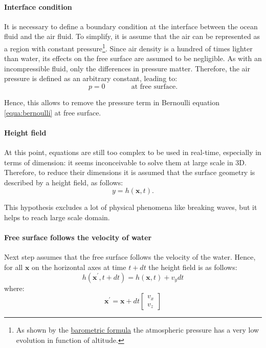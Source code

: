 \documentclass[final]{jcgt}
\begin{document}
\paragraph{Interface condition}
It is necessary to define a boundary condition at the interface between the ocean fluid and the air fluid.
To simplify, it is assume that the air can be represented as a region with constant pressure\footnote{As shown by the \href{https://en.wikipedia.org/wiki/Barometric_formula}{barometric formula} the atmospheric pressure has a very low evolution in function of altitude.}.
Since air density is a hundred of times lighter than water, its effects on the free surface are assumed to be negligible.
As with an incompressible fluid, only the differences in pressure matter.
Therefore, the air pressure is defined as an arbitrary constant, leading to:
\begin{equation}
	p = 0\text{~~~~~~~~~~~at free surface.}
\end{equation}

Hence, this allows to remove the pressure term in Bernoulli equation \ref{equa:bernoulli} at free surface.

\paragraph{Height field}
At this point, equations are still too complex to be used in real-time, especially in terms of dimension:
it seems inconceivable to solve them at large scale in 3D.
Therefore, to reduce their dimensions it is assumed that the surface geometry is described by a height field, as follows:
\begin{equation}
	y = h(\mathbf x, t).
\end{equation}

This hypothesis excludes a lot of physical phenomena like breaking waves, but it helps to reach large scale domain.

\paragraph{Free surface follows the velocity of water}
Next step assumes that the free surface follows the velocity of the water.
Hence, for all $\mathbf x$ on the horizontal axes at time $t + dt$ the height field is as follows:
\begin{equation}
	h(\mathbf{x^{\prime}}, t + dt) = h(\mathbf x, t) + {v_y}dt\label{equa:freeSurfaceFollowWater0}
\end{equation}
where:
\begin{equation}
	\mathbf{x^{\prime}} = \mathbf x + dt\left[\begin{array}{c}v_x\\ v_z\end{array}\right]
	\label{equa:freeSurfaceFollowWater1}
\end{equation}
\end{document}
